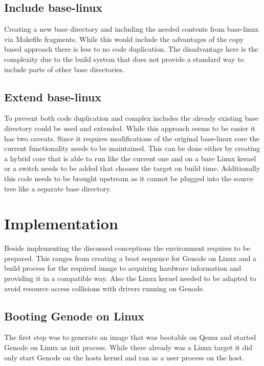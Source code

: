 \documentclass[
a4paper,
12pt,
notitlepage,
parskip=half,
DIV=11,
]{scrbook}
\begin{document}
		\subsection{Include base-linux}
		Creating a new base directory and including the needed contents from base-linux via Makefile fragments.
		While this would include the advantages of the copy based approach there is less to no code duplication.
		The disadvantage here is the complexity due to the build system that does not provide a standard way to include parts of other base directories.
		
		\subsection{Extend base-linux}
		To prevent both code duplication and complex includes the already existing base directory could be used and extended.
		While this approach seems to be easier it has two caveats.
		Since it requires modifications of the original base-linux core the current functionality needs to be maintained.
		This can be done either by creating a hybrid core that is able to run like the current one and on a bare Linux kernel or a switch needs to be added that chooses the target on build time.
		Additionally this code needs to be brought upstream as it cannot be plugged into the source tree like a separate base directory.
		
	
		\section{Implementation}
		
		Beside implementing the discussed conceptions the environment requires to be prepared.
		This ranges from creating a boot sequence for Genode on Linux and a build process for the required image to acquiring hardware information and providing it in a compatible way.
		Also the Linux kernel needed to be adapted to avoid resource access collisions with drivers running on Genode.
		
		\subsection{Booting Genode on Linux}
		
		The first step was to generate an image that was bootable on Qemu and started Genode on Linux as init process.
		While there already was a Linux target it did only start Genode on the hosts kernel and ran as a user process on the host.
		
\end{document}
